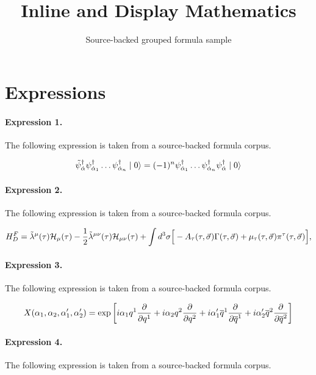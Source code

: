 \documentclass[11pt]{article}
\title{Inline and Display Mathematics}
\author{Source-backed grouped formula sample}
\date{}
\begin{document}
\maketitle
\section{Expressions}
\paragraph{Expression 1.} The following expression is taken from a source-backed formula corpus.

\begin{align*}\tilde{\psi}^{\dagger}_{\dot{\alpha}} \psi^{\dagger}_{\dot{\alpha}_{1}} \ldots \psi^{\dagger}_{\dot{\alpha}_{n}} \mid 0 \rangle = (-1)^{n} \psi^{\dagger}_{\dot{\alpha}_{1}} \ldots \psi^{\dagger}_{\dot{\alpha}_{n}}\psi^{\dagger}_{\dot{\alpha}} \mid 0 \rangle \vspace{-3pt}\end{align*}

\paragraph{Expression 2.} The following expression is taken from a source-backed formula corpus.

\begin{align*}H^F_D = \tilde{\lambda}^\mu(\tau) {\cal H}_\mu(\tau) - \frac 12 \tilde{\lambda}^{\mu \nu}(\tau) {\cal H}_{\mu \nu}(\tau) + \int{d^3\sigma \Big[ -A_\tau (\tau, \vec{\sigma}) \Gamma (\tau, \vec{\sigma}) + \mu_\tau (\tau,\vec{\sigma}) \pi^\tau (\tau, \vec{\sigma}) \Big] }, \end{align*}

\paragraph{Expression 3.} The following expression is taken from a source-backed formula corpus.

\begin{align*}X(\alpha_1,\alpha_2,\alpha'_1,\alpha'_2)=\exp \left[ i\alpha_1 q^1{\partial\over\partial q^1}+ i\alpha_2 q^2{\partial\over\partial q^2}+i\alpha'_1 \overline{q}^1{\partial\over\partial \overline{q}^1}+i\alpha'_2 \overline{q}^2{\partial\over\partial \overline{q}^2}\right]\end{align*}

\paragraph{Expression 4.} The following expression is taken from a source-backed formula corpus.
\end{document}
